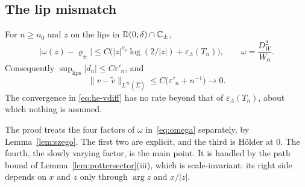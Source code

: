 \subsection{The lip mismatch}\label{sec:he-mismatch}

\begin{lemma}\label{lem:lip-mismatch}
For $n\ge n_0$ and $z$ on the lips in $\mathbb D(0,\delta)\cap\mathbb{C}_\pm$,
\begin{equation}\label{eq:he-mismatch}
  \bigl|\omega(z)-\varrho_\pm\bigr|\le C\bigl(|z|^{\nu_p}\log(2/|z|)+\varepsilon_\Lambda(T_n)\bigr),\qquad \omega=\frac{D_W^2}{W_0}.
\end{equation}
Consequently $\sup_{\mathrm{lips}}|d_n|\le C\varepsilon'_n$, and
\begin{equation}\label{eq:he-vdiff}
  \|v-\tilde v\|_{L^\infty(\hat\Sigma)}\le C\bigl(\varepsilon'_n+n^{-1}\bigr)\longrightarrow0 .
\end{equation}
The convergence in \eqref{eq:he-vdiff} has no rate beyond that of $\varepsilon_\Lambda(T_n)$, about which nothing is
assumed.
\end{lemma}

The proof treats the four factors of $\omega$ in~\eqref{eq:omega} separately, by Lemma~\ref{lem:szego}. The first two
are explicit, and the third is H\"older at $0$. The fourth, the slowly varying factor, is the main point. It is handled
by the path bound of Lemma~\ref{lem:pottersector}(iii), which is scale-invariant: its right side depends on $x$ and $z$
only through $\arg z$ and $x/|z|$.

